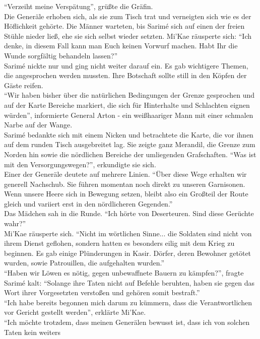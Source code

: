 ``Verzeiht meine Verspätung'', grüßte die Gräfin.\\
Die Generäle erhoben sich, als sie zum Tisch trat und verneigten sich wie es der Höflichkeit 
gehörte. Die Männer warteten, bis Sarimé sich auf einen der freien Stühle nieder ließ, ehe sie sich 
selbst wieder setzten. Mi'Kae räusperte sich: ``Ich denke, in diesem Fall kann man Euch keinen 
Vorwurf machen. Habt Ihr die Wunde sorgfältig behandeln lassen?''\\
Sarimé nickte nur und ging nicht weiter darauf ein. Es gab wichtigere Themen, die angesprochen 
werden mussten. Ihre Botschaft sollte still in den Köpfen der Gäste reifen.\\
``Wir haben bisher über die natürlichen Bedingungen der Grenze gesprochen und auf der Karte 
Bereiche markiert, die sich für Hinterhalte und Schlachten eignen würden'', informierte General 
Arton - ein weißhaariger Mann mit einer schmalen Narbe auf der Wange.\\
Sarimé bedankte sich mit einem Nicken und betrachtete die Karte, die vor ihnen auf dem runden Tisch 
ausgebreitet lag. Sie zeigte ganz Merandil, die Grenze zum Norden hin sowie die nördlichen Bereiche 
der umliegenden Grafschaften. ``Was ist mit den Versorgungswegen?'', erkundigte sie sich.\\
Einer der Generäle deutete auf mehrere Linien. ``Über diese Wege erhalten wir generell Nachschub. 
Sie führen momentan noch direkt zu unseren Garnisonen. Wenn unsere Heere sich in Bewegung setzen, 
bleibt also ein Großteil der Route gleich und variiert erst in den nördlicheren Gegenden.''\\
Das Mädchen sah in die Runde. ``Ich hörte von Deserteuren. Sind diese Gerüchte wahr?''\\
Mi'Kae räusperte sich. ``Nicht im wörtlichen Sinne... die Soldaten sind nicht von ihrem Dienst 
geflohen, sondern hatten es besonders eilig mit dem Krieg zu beginnen. Es gab einige Plünderungen 
in Kasir. Dörfer, deren Bewohner getötet wurden, sowie Patrouillen, die aufgehalten wurden.''\\
``Haben wir Löwen es nötig, gegen unbewaffnete Bauern zu kämpfen?'', fragte Sarimé kalt: ``Solange 
ihre Taten nicht auf Befehle beruhten, haben sie gegen das Wort ihrer Vorgesetzten verstoßen und 
gehören somit bestraft.''\\
``Ich habe bereits begonnen mich darum zu kümmern, dass die Verantwortlichen vor Gericht gestellt 
werden'', erklärte Mi'Kae.\\
``Ich möchte trotzdem, dass meinen Generälen bewusst ist, dass ich von solchen Taten kein weiters 
